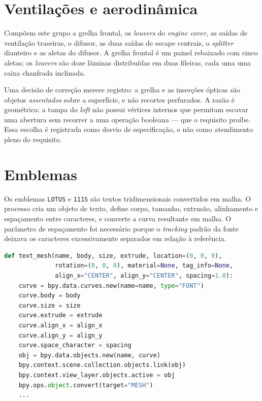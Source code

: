 \section{Ventila{\c{c}}\~oes e aerodin\^amica}\label{sec:ventilacoes}

Comp\~oem este grupo a grelha frontal, os \emph{louvers} do \emph{engine cover}, as
sa\'idas de ventila{\c{c}}\~ao traseiras, o difusor, as duas sa\'idas de escape centrais, o
\emph{splitter} dianteiro e as aletas do difusor. A grelha frontal \'e um painel
rebaixado com cinco aletas; os \emph{louvers} s\~ao doze l\^aminas
distribu\'idas em duas fileiras, cada uma uma caixa chanfrada inclinada.

Uma decis\~ao de corre{\c{c}}\~ao merece registro: a grelha e as inser{\c{c}}\~oes
\'opticas s\~ao objetos \emph{assentados} sobre a superf\'icie, e n\~ao recortes perfurados. A
raz\~ao \'e geom\'etrica: a tampa do \emph{loft} n\~ao possui v\'ertices internos que
permitam escavar uma abertura sem recorrer a uma opera{\c{c}}\~ao booleana --- que o requisito
pro\'ibe. Essa escolha \'e registrada como desvio de especifica{\c{c}}\~ao, e n\~ao como
atendimento pleno do requisito.

\section{Emblemas}\label{sec:emblemas}

Os emblemas \texttt{LOTUS} e \texttt{111S} s\~ao textos tridimensionais convertidos em malha. O
processo cria um objeto de texto, define corpo, tamanho, extrus\~ao, alinhamento e
espa{\c{c}}amento entre caracteres, e converte a curva resultante em malha. O par\^ametro de
espa{\c{c}}amento foi necess\'ario porque o \emph{tracking} padr\~ao da fonte deixava os
caracteres excessivamente separados em rela{\c{c}}\~ao \`a refer\^encia.

\begin{lstlisting}[language=Python]
def text_mesh(name, body, size, extrude, location=(0, 0, 0),
              rotation=(0, 0, 0), material=None, tag_info=None,
              align_x="CENTER", align_y="CENTER", spacing=1.0):
    curve = bpy.data.curves.new(name=name, type="FONT")
    curve.body = body
    curve.size = size
    curve.extrude = extrude
    curve.align_x = align_x
    curve.align_y = align_y
    curve.space_character = spacing
    obj = bpy.data.objects.new(name, curve)
    bpy.context.scene.collection.objects.link(obj)
    bpy.context.view_layer.objects.active = obj
    bpy.ops.object.convert(target="MESH")
    ...
\end{lstlisting}

